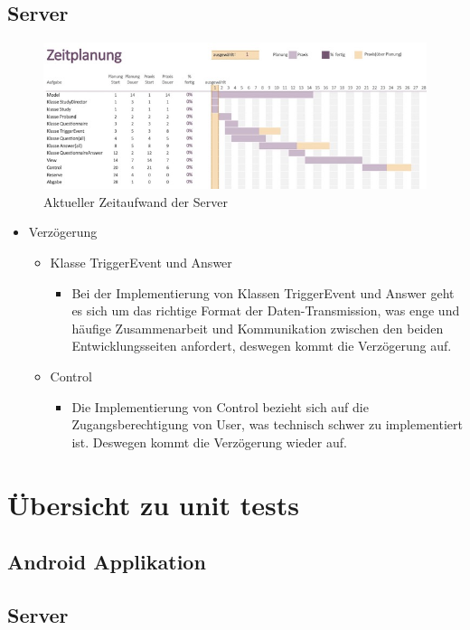 \documentclass[a4paper]{scrreprt}
\begin{document}
\begin{itemize}
        \end{itemize}


        \section{Server}
        \begin{figure}[H]
        	\centering
        	\includegraphics[scale = 0.65]{ServerZeitPlanung.jpg}
        	\caption{Aktueller Zeitaufwand der Server }
        \end{figure}
        \begin{itemize}
        	\item Verzögerung
        	\begin{itemize}
        		\item Klasse TriggerEvent und Answer
        		\begin{itemize}
        			\item Bei der Implementierung von Klassen TriggerEvent und Answer geht es sich um das richtige Format der Daten-Transmission, was enge und häufige Zusammenarbeit und Kommunikation zwischen den beiden Entwicklungsseiten anfordert, deswegen kommt die Verzögerung auf.
        		\end{itemize}
        	\end{itemize}
        	\begin{itemize}
        		\item Control
        		\begin{itemize}
        			\item Die Implementierung von Control bezieht sich auf die Zugangsberechtigung von User, was technisch schwer zu implementiert ist. Deswegen kommt die Verzögerung wieder auf.
        		\end{itemize}
        	\end{itemize}
        	
        \end{itemize}

       \newpage

    \chapter{Übersicht zu unit tests}

        \section{Android Applikation}

        \section{Server}

    \newpage
\end{document}
